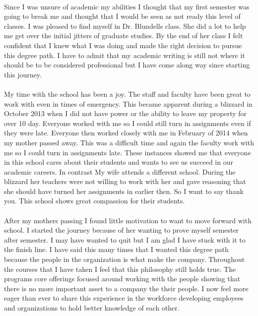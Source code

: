 \documentclass[12pt,titlepage]{article}
\begin{document}
\paragraph {}
Since I was unsure of academic my abilities I thought that my first semester was going to break me and thought that I would be seen as not ready this level of classes. I was pleased to find myself in Dr. Blundells class. She did a lot to help me get over the initial jitters of graduate studies. By the end of her class I felt confident that I knew what I was doing and made the right decision to pursue this degree path. I have to admit that my academic writing is still not where it should be to be considered professional but I have come along way since starting this journey.
\paragraph {}
My time with the school has been a joy. The staff and faculty have been great to work with even in times of emergency. This became apparent during a blizzard in October 2013 when I did not have power or the ability to leave my property for over 10 day. Everyone worked with me so I could still turn in assignments even if they were late. Everyone then worked closely with me in February of 2014 when my mother passed away. This was a difficult time and again the faculty work with me so I could turn in assignments late.  These instances showed me that everyone in this school cares about their students and wants to see us succeed in our academic careers. In contrast My wife attends a different school. During the blizzard her teachers were not willing to work with her and gave reasoning that she should have turned her assignments in earlier then. So I want to say thank you. This school shows great compassion for their students.
\paragraph {}
After my mothers passing I found little motivation to want to move forward with school. I started the journey because of her wanting to prove myself semester after semester. I may have wanted to quit but I am glad I have stuck with it to the finish line. I have said this many times that I wanted this degree path because the people in the organization is what make the company. Throughout the courses that I have taken I feel that this philosophy still holds true. The programs core offerings focused around working with the people showing that there is no more important asset to a company the their people. I now feel more eager than ever to share this experience in the workforce developing employees and organizations to hold better knowledge of each other.
\end{document}
